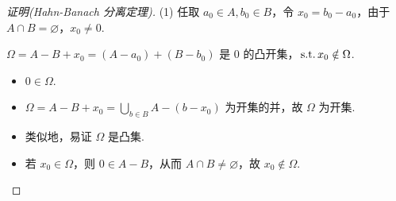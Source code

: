 \begin{proof}[证明(Hahn-Banach 分离定理)]\par
    \hspace{-1.6 em}(1) 任取 $a_0 \in A, b_0 \in B$，令 $x_0 = b_0 - a_0$，由于 $A \cap B = \varnothing$，$x_0 \neq 0$.\par
    \begin{claim}{$\Omega = A - B + x_0 = (A - a_0) + (B - b_0)$ 是 $0$ 的凸开集，$\operatorname{\,\text{s.t.}} x_0 \notin \Omega$.}
        \begin{itemize}
        \item $0 \in \Omega$.
        \item $\Omega = A - B + x_0 = \bigcup_{b \in B} A - (b - x_0)$ 为开集的并，故 $\Omega$ 为开集.
        \item 类似地，易证 $\Omega$ 是凸集.
        \item 若 $x_0 \in \Omega$，则 $0 \in A - B$，从而 $A \cap B \neq \varnothing$，故 $x_0 \notin \Omega$.\qedhere
    \end{itemize}
    \end{claim}


\end{proof}
